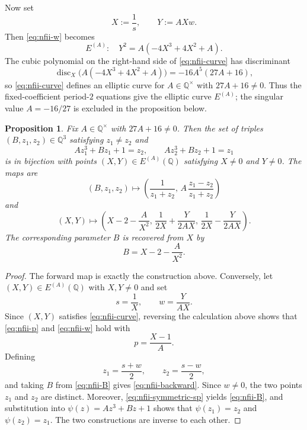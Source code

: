 \documentclass[11pt,a4paper]{amsart}
\newtheorem{proposition}[theorem]{Proposition}
\theoremstyle{definition}
\theoremstyle{remark}
\numberwithin{equation}{section}
\newcommand{\Q}{\mathbb{Q}}
\begin{document}
Now set
\begin{equation}\label{eq:nfii-XY}
X:=\frac{1}{s},\qquad Y:=AXw.
\end{equation}
Then \eqref{eq:nfii-w} becomes
\begin{equation}\label{eq:nfii-curve}
E^{(A)}:\quad Y^2=A(-4X^3+4X^2+A).
\end{equation}
The cubic polynomial on the right-hand side of \eqref{eq:nfii-curve} has
discriminant
\[
\operatorname{disc}_X\!\bigl(A(-4X^3+4X^2+A)\bigr)
=-16A^5(27A+16),
\]
so \eqref{eq:nfii-curve} defines an elliptic curve for $A\in\Q^\times$ with $27A+16\neq 0$. Thus the fixed-coefficient period-$2$ equations give the elliptic curve \(E^{(A)}\); the singular value $A=-16/27$ is excluded in the proposition below.

\begin{proposition}\label{prop:nfii-period-two}
Fix $A\in\Q^\times$ with $27A+16\neq 0$. Then the set of triples
$(B,z_1,z_2)\in\Q^3$ satisfying $z_1\neq z_2$ and
\[
Az_1^3+Bz_1+1=z_2,\qquad Az_2^3+Bz_2+1=z_1
\]
is in bijection with points $(X,Y)\in E^{(A)}(\Q)$ satisfying
$X\neq 0$ and $Y\neq 0$. The maps are
\begin{equation}\label{eq:nfii-forward}
(B,z_1,z_2)\longmapsto \left(\frac{1}{z_1+z_2},\,A\,\frac{z_1-z_2}{z_1+z_2}\right)
\end{equation}
and
\begin{equation}\label{eq:nfii-backward}
(X,Y)\longmapsto
\left(X-2-\frac{A}{X^2},\,\frac{1}{2X}+\frac{Y}{2AX},\,\frac{1}{2X}-\frac{Y}{2AX}\right).
\end{equation}
The corresponding parameter $B$ is recovered from $X$ by
\begin{equation}\label{eq:nfii-B}
B=X-2-\frac{A}{X^2}.
\end{equation}
\end{proposition}

\begin{proof}
The forward map is exactly the construction above. Conversely, let $(X,Y)\in E^{(A)}(\Q)$ with $X,Y\neq 0$ and set
\[
s=\frac{1}{X},\qquad w=\frac{Y}{AX}.
\]
Since $(X,Y)$ satisfies \eqref{eq:nfii-curve}, reversing the calculation above shows that \eqref{eq:nfii-p} and \eqref{eq:nfii-w} hold with
\[
p=\frac{X-1}{A}.
\]
Defining
\[
z_1=\frac{s+w}{2},\qquad z_2=\frac{s-w}{2},
\]
and taking $B$ from \eqref{eq:nfii-B} gives \eqref{eq:nfii-backward}.
Since $w\neq0$, the two points $z_1$ and $z_2$ are distinct. Moreover, \eqref{eq:nfii-symmetric-sp} yields \eqref{eq:nfii-B}, and substitution into $\psi(z)=Az^3+Bz+1$ shows that $\psi(z_1)=z_2$ and $\psi(z_2)=z_1$. The two constructions are inverse to each other.
\end{proof}
\end{document}
